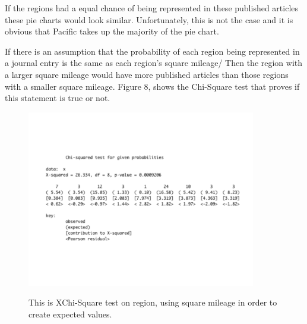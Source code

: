 \documentclass[12pt, letterpaper]{article}
\begin{document}
If the regions had a equal chance of being represented in these published articles these pie charts would look similar. Unfortunately, this is not the case and it is obvious that Pacific takes up the majority of the pie chart.

If there is an assumption that the probability of each region being represented in a journal entry is the same as each region's square mileage/ Then the region with a larger square mileage would have more published articles than those regions with a smaller square mileage. Figure 8, shows the Chi-Square test that proves if this statement is true or not.
\begin{figure}[!h]
\begin{center}
\includegraphics[width=10cm]{RegionChiSquare2.pdf}
\label{fig: Region XChi-Square with Square Mileage}
\caption{This is XChi-Square test on region, using square mileage in order to create expected values.}
\end{center}
\end{figure}
\end{document}
